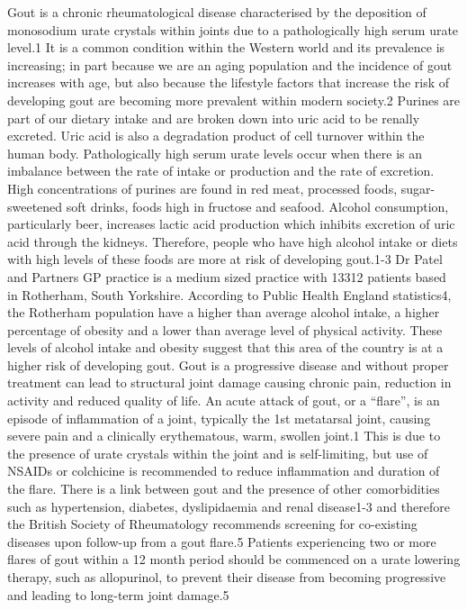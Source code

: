 \documentclass[paper=a4,fontsize=11pt,twocolumn]{article}
\begin{document}
Gout is a chronic rheumatological disease characterised by the deposition of monosodium urate crystals within joints due to a pathologically high serum urate level.1 It is a common condition within the Western world and its prevalence is increasing; in part because we are an aging population and the incidence of gout increases with age, but also because the lifestyle factors that increase the risk of developing gout are becoming more prevalent within modern society.2
Purines are part of our dietary intake and are broken down into uric acid to be renally excreted. Uric acid is also a degradation product of cell turnover within the human body. Pathologically high serum urate levels occur when there is an imbalance between the rate of intake or production and the rate of excretion. High concentrations of purines are found in red meat, processed foods, sugar-sweetened soft drinks, foods high in fructose and seafood. Alcohol consumption, particularly beer, increases lactic acid production which inhibits excretion of uric acid through the kidneys. Therefore, people who have high alcohol intake or diets with high levels of these foods are more at risk of developing gout.1-3
Dr Patel and Partners GP practice is a medium sized practice with 13312 patients based in Rotherham, South Yorkshire. According to Public Health England statistics4, the Rotherham population have a higher than average alcohol intake, a higher percentage of obesity and a lower than average level of physical activity. These levels of alcohol intake and obesity suggest that this area of the country is at a higher risk of developing gout. 
Gout is a progressive disease and without proper treatment can lead to structural joint damage causing chronic pain, reduction in activity and reduced quality of life. An acute attack of gout, or a “flare”, is an episode of inflammation of a joint, typically the 1st metatarsal joint, causing severe pain and a clinically erythematous, warm, swollen joint.1 This is due to the presence of urate crystals within the joint and is self-limiting, but use of NSAIDs or colchicine is recommended to reduce inflammation and duration of the flare. There is a link between gout and the presence of other comorbidities such as hypertension, diabetes, dyslipidaemia and renal disease1-3 and therefore the British Society of Rheumatology recommends screening for co-existing diseases upon follow-up from a gout flare.5 Patients experiencing two or more flares of gout within a 12 month period should be commenced on a urate lowering therapy, such as allopurinol, to prevent their disease from becoming progressive and leading to long-term joint damage.5
\end{document}
